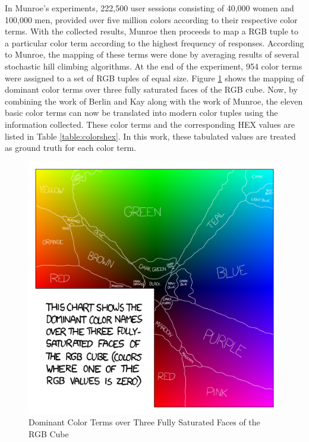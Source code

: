 In Munroe's experiments, 222,500 user sessions consisting of 40,000 women and 100,000 men, provided over five million colors according to their respective color terms. With the collected results, Munroe then proceeds to map a RGB tuple to a particular color term according to the highest frequency of responses. According to Munroe, the mapping of these terms were done by averaging results of several stochastic hill climbing algorithms. At the end of the experiment, 954 color terms were assigned to a set of RGB tuples of equal size. Figure \ref{fig:xkcd} shows the mapping of dominant color terms over three fully saturated faces of the RGB cube. Now, by combining the work of Berlin and Kay along with the work of Munroe, the eleven basic color terms can now be translated into modern color tuples using the information collected. These color terms and the corresponding HEX values are listed in Table \ref{table:colorshex}. In this work, these tabulated values are treated as ground truth for each color term. 


\begin{figure}[hbt!]\centering
\includegraphics[width=.6\textwidth]{image/general/xkcd.png}
\caption{Dominant Color Terms over Three Fully Saturated Faces of the RGB Cube}
\label{fig:xkcd}
\end{figure}


